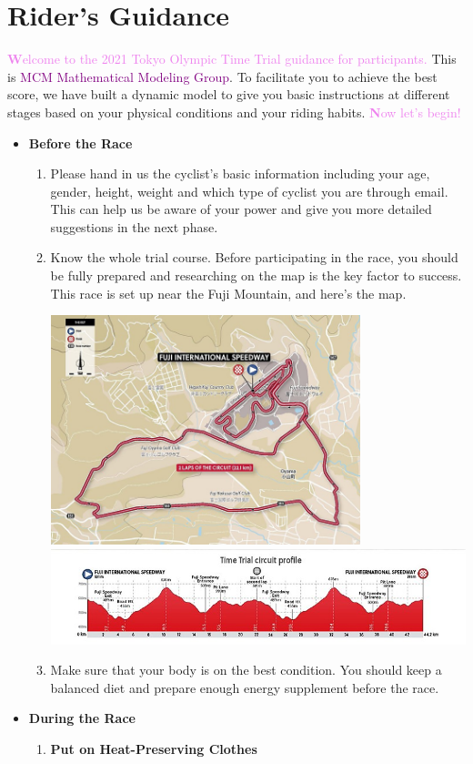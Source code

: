 \documentclass{article}
\newcommand{\itembf}{\item \textbf}
\newcommand{\violetbf}[1]{\textcolor{violet}{\textbf #1}}
\begin{document}
	\section{Rider's Guidance}
	\violetbf{Welcome to the 2021 Tokyo Olympic Time Trial guidance for participants.} This is \textcolor{purple}{MCM Mathematical Modeling Group}. To facilitate you to achieve the best score, we have built a dynamic model to give you basic instructions at different stages based on your physical conditions and your riding habits. \violetbf{Now let's begin!}
	\begin{itemize}
	\itembf {Before the Race}
	\begin{enumerate}		
		\item  Please hand in us the cyclist's basic information including your age, gender, height, weight and which type of cyclist you are through email. This can help us be aware of your power and give you more detailed suggestions in the next phase.
		\item Know the whole trial course. Before participating in the race, you should be fully prepared and researching on the map is the key factor to success. This race is set up near the Fuji Mountain, and here's the map.\cite{tokyo}

			\begin{center}
				\includegraphics[width=9cm]{1.jpg}\\
				\includegraphics[width=14cm]{3.jpg}
			\end{center}

		\item Make sure that your body is on the best condition. You should keep a balanced diet and prepare enough energy supplement before the race. 
	\end{enumerate}
	\itembf{During the Race}
	\begin{enumerate}
		\itembf{Put on Heat-Preserving Clothes}


\end{enumerate}
\end{itemize}
\end{document}
